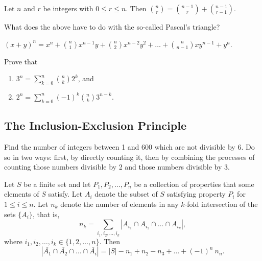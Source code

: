 \begin{theorem} Let $n$ and $r$ be integers with $0\leq r \leq n$.  Then ${{n}\choose{r}} = {{n-1}\choose{r}} + {{n-1}\choose{r-1}}$.
\end{theorem}

\begin{exercise} What does the above have to do with the so-called Pascal's triangle?
\end{exercise}

\begin{theorem} $(x+y)^n = x^n + {{n}\choose{1}} x^{n-1} y + {{n}\choose{2}} x^{n-2}y^2 + \ldots + {{n}\choose{n-1}} x y^{n-1} + y^n$.
\end{theorem}

\begin{exercise} Prove that
    \begin{enumerate}
        \item $\displaystyle 3^n = \sum_{k=0}^n {{n}\choose{k}} 2^k$, and
        \item $\displaystyle 2^n = \sum_{k=0}^n (-1)^k {{n}\choose{k}} 3^{n-k}$.
    \end{enumerate}
\end{exercise}

\subsection{The Inclusion-Exclusion Principle}

\begin{exercise} Find the number of integers between 1 and 600 which are not divisible by 6.  Do so in two ways: first, by directly counting it, then by combining the processes of counting those numbers divisible by 2 and those numbers divisible by 3.
\end{exercise}

\begin{theorem} Let $S$ be a finite set and let $P_1, P_2, \ldots, P_n$ be a collection of properties that some elements of $S$ satisfy.  Let $A_i$ denote the subset of $S$ satisfying property $P_i$ for $1\leq i \leq n$.  Let $n_k$ denote the number of elements in any $k$-fold intersection of the sets $\{A_i\}$, that is,
$$n_k = \displaystyle \sum_{i_1, i_2, \ldots, i_k} |A_{i_1} \cap A_{i_2} \cap \ldots \cap A_{i_k}|,$$
where $i_1, i_2, \ldots, i_k \in \{1, 2, \ldots, n\}$.  Then
$$|\overline{A_1}\cap \overline{A_2}\cap \ldots \cap \overline{A_i} |= |S| - n_1 + n_2 - n_3 + \ldots + (-1)^n\ n_n.$$
\end{theorem}

